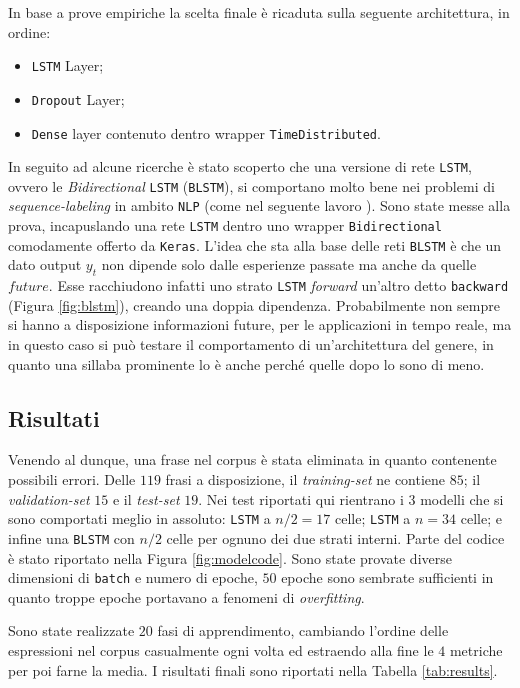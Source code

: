 \documentclass[twoside,twocolumn,10pt]{extarticle}
\theoremstyle{definition}
\begin{document}
		In base a prove empiriche la scelta finale è ricaduta sulla seguente architettura, in ordine:
		\begin{itemize}
			\item \texttt{LSTM} Layer;
			\item \texttt{Dropout} Layer;
			\item \texttt{Dense} layer contenuto dentro wrapper \texttt{TimeDistributed}.
		\end{itemize}
		In seguito ad alcune ricerche è stato scoperto che una versione di rete \texttt{LSTM}, ovvero le \textit{Bidirectional} \texttt{LSTM} (\texttt{BLSTM}), si comportano molto bene nei problemi di \textit{sequence-labeling} in ambito \texttt{NLP} (come nel seguente lavoro \cite[Capitolo 5]{bib:blstm}). Sono state messe alla prova, incapuslando una rete \texttt{LSTM} dentro uno wrapper \texttt{Bidirectional} comodamente offerto da \texttt{Keras}. L'idea che sta alla base delle reti \texttt{BLSTM} è che un dato output $y_t$ non dipende solo dalle esperienze passate ma anche da quelle $future$. Esse racchiudono infatti uno strato \texttt{LSTM} \textit{forward} un'altro detto \texttt{backward} (Figura \ref{fig:blstm}), creando una doppia dipendenza. Probabilmente non sempre si hanno a disposizione informazioni future, per le applicazioni in tempo reale, ma in questo caso si può testare il comportamento di un'architettura del genere, in quanto una sillaba prominente lo è anche perché quelle dopo lo sono di meno.
	
	\subsection{Risultati}
		Venendo al dunque, una frase nel corpus è stata eliminata in quanto contenente possibili errori. Delle $119$ frasi a disposizione, il \textit{training-set} ne contiene $85$; il \textit{validation-set} $15$ e il \textit{test-set} $19$. Nei test riportati qui rientrano i $3$ modelli che si sono comportati meglio in assoluto: \texttt{LSTM} a $n/2 = 17$ celle; \texttt{LSTM} a $n = 34$ celle; e infine una \texttt{BLSTM} con $n/2$ celle per ognuno dei due strati interni. Parte del codice è stato riportato nella Figura \ref{fig:modelcode}. Sono state provate diverse dimensioni di \texttt{batch} e numero di epoche, $50$ epoche sono sembrate sufficienti in quanto troppe epoche portavano a fenomeni di \textit{overfitting}.
		
		Sono state realizzate $20$ fasi di apprendimento, cambiando l'ordine delle espressioni nel corpus casualmente ogni volta ed estraendo alla fine le $4$ metriche per poi farne la media. I risultati finali sono riportati nella Tabella \ref{tab:results}.
	
\end{document}
